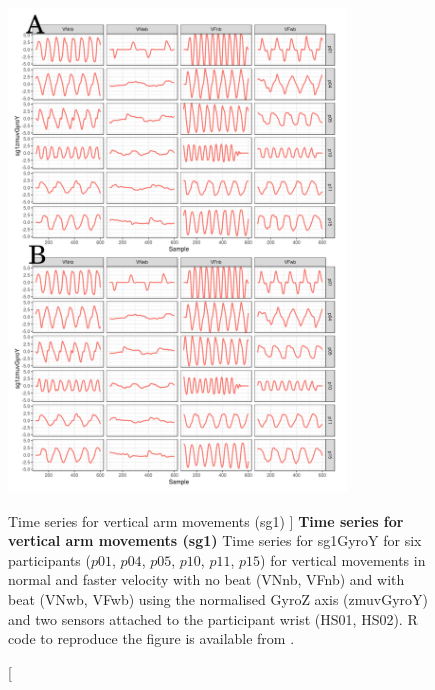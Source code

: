 \begin{figure}
\centering
\includegraphics[width=0.8\textwidth]{tssg1gyroY}
	\caption
	[Time series for vertical arm movements (sg1) ]{
	{\bf Time series for vertical arm movements (sg1)}
		Time series for sg1GyroY for six participants 
		($p01$, $p04$, $p05$, $p10$, $p11$, $p15$) 
		for vertical movements in normal and faster velocity with
		no beat	(VNnb, VFnb) and with beat (VNwb, VFwb) using 
		the normalised GyroZ axis (zmuvGyroY) and 
		two sensors attached to the participant wrist (HS01, HS02).
	R code to reproduce the figure is available from \cite{hwum2018}.
	}
    \label{fig:tssg1gyroY-hii}
\end{figure}


